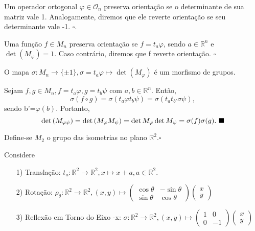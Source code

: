 \documentclass[Algebra/algebra_notes.tex]{subfiles}
\begin{document}
\begin{def*}
	Um operador ortogonal $\varphi \in \mathcal{O}_{n}$ preserva orientação se o determinante de sua matriz vale 1. Analogamente,
	diremos que ele reverte orientação se seu determinante vale -1. $\square$.
\end{def*}
\begin{def*}
	Uma função $f\in M_{n}$ preserva orientação se $f=t_{a}\varphi $, sendo $a\in \mathbb{R}^{n}$ e $\det{(M_{\varphi })} = 1.$
	Caso contrário, diremos que f reverte orientação. $\square$
\end{def*}
\begin{lemma*}
	O mapa $\sigma :M_{n}\rightarrow \{\pm1\}, \sigma =t_{a}\varphi\mapsto \det{(M_{\varphi })}$ é um morfismo de grupos.
\end{lemma*}
\begin{proof*}
	Sejam $f, g\in M_{n}, f = t_{a}\varphi , g = t_{b}\psi$ com $a, b\in \mathbb{R}^{n}$. Então,
	$$
		\sigma (f\circ{}g) = \sigma (t_{a}\varphi t_{b}\psi) = \sigma (t_{a}t_{b'}\sigma \psi),
	$$
	sendo b'=$\varphi (b).$ Portanto,
	$$
		\det{(M_{\varphi \psi})} = \det{(M_{\varphi }M_{\psi})} = \det{M_{\varphi }}\det{M_{\psi}}=\sigma (f)\sigma (g).\text{ $\blacksquare$}
	$$
\end{proof*}
\begin{def*}
	Define-se $M_{2}$ o grupo das isometrias no plano $\mathbb{R}^{2}.\square$
\end{def*}
Considere
\begin{itemize}
	\item[1)] Translação: $t_{a}:\mathbb{R}^{2}\rightarrow \mathbb{R}^{2}, x\mapsto x+a, a\in \mathbb{R}^{2}.$
	\item[2)] Rotação: $\rho_{\theta }:\mathbb{R}^{2}\rightarrow \mathbb{R}^{2}, (x,y)\mapsto \begin{pmatrix}
			      \cos{\theta } & -\sin{\theta } \\
			      \sin{\theta } & \cos{\theta }
		      \end{pmatrix} \begin{pmatrix}
			      x \\
			      y
		      \end{pmatrix}$
	\item[3)] Reflexão em Torno do Eixo -x: $\sigma :\mathbb{R}^{2}\rightarrow \mathbb{R}^{2}, (x,y)\mapsto \begin{pmatrix}
			      1 & 0  \\
			      0 & -1
		      \end{pmatrix}\begin{pmatrix}
			      x \\
			      y
		      \end{pmatrix}$
\end{itemize}
\end{document}
